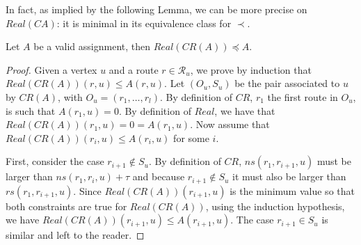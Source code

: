 \documentclass[english]{article}
\begin{document}
In fact, as implied by the following Lemma, we can be more precise on $Real(CA)$: it is minimal in its equivalence class for $\prec$.

\begin{lemma}\label{lemma:prec}
Let $A$ be a valid assignment, then $Real(CR(A)) \preceq A$.
\end{lemma}
\begin{proof}
Given a vertex $u$ and a route $r \in \mathcal{R}_u$, we prove by induction that $Real(CR(A))(r,u) \leq A(r,u)$.
Let $(O_u,S_u)$ be the pair associated to $u$ by $CR(A)$, with $O_u = (r_1,\dots,r_l)$. By definition of $CR$, $r_1$ the first route in $O_u$, is such that $A(r_1,u) = 0$. By definition of $Real$, we have that  $Real(CR(A))(r_1,u) = 0 = A(r_1,u)$.
Now assume that $Real(CR(A))(r_i,u) \leq A(r_i,u)$ for some $i$. 

First, consider the case $r_{i+1} \notin S_u$. By definition of $CR$, $ns(r_1,r_{i+1},u)$ must be larger than 
$ns(r_1,r_{i},u)+ \tau$ and because $r_{i+1} \notin S_u$ it must also be larger than $rs(r_1,r_{i+1},u)$. 
Since $Real(CR(A))(r_{i+1},u)$ is the minimum value so that both constraints are true for $Real(CR(A))$, using
the induction hypothesis, we have $Real(CR(A))(r_{i+1},u) \leq A(r_{i+1},u)$. The case $r_{i+1} \in S_u$ is similar
and left to the reader.
\end{proof}


% 
% 
% 
% 
% 
\end{document}
